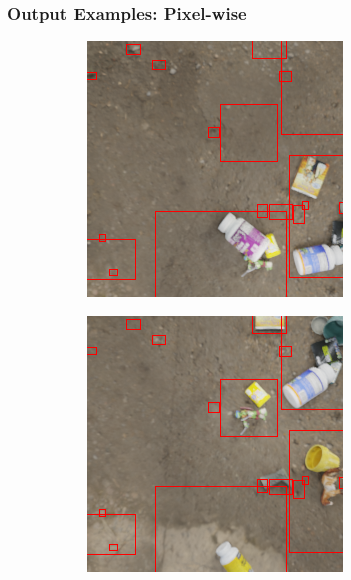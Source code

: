 \documentclass[13.5pt,aspecratio=169, xcolor=dvipsnames]{beamer}
\begin{document}
\begin{frame}
    \end{frame}


\begin{frame}
    \onehalfspacing
        \frametitle{Output Examples: Pixel-wise}    
        \begin{figure}
            \begin{subfigure}{0.5\textwidth}
              \centering
              \includegraphics[width=\linewidth]{Example/Output/PW_1.png}
              \captionsetup{labelformat=empty}
            \end{subfigure}%
            \begin{subfigure}{0.5\textwidth}
              \centering
              \includegraphics[width=\linewidth]{Example/Output/PW_1_2.png}

\end{subfigure}
\end{figure}
\end{frame}
\end{document}
